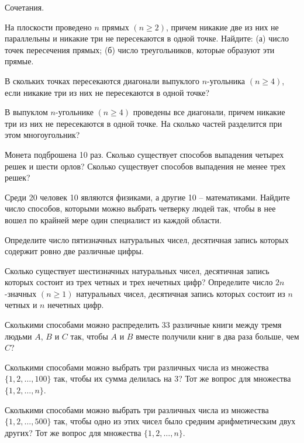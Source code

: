 \biLangHeader
{}
{Сочетания.}

\begin{problemList}

\problemItemSimple
{}
{На плоскости проведено $n$ прямых $(n \ge 2)$, причем никакие две из
них не параллельны и никакие три не пересекаются в одной точке.
Найдите: (а) число точек пересечения прямых; (б) число треугольников,
которые образуют эти прямые.}

\problemItemSimple
{}
{В скольких точках пересекаются диагонали выпуклого $n$-угольника
$(n \ge 4)$, если никакие три из них не пересекаются в одной точке?}

\problemItemSimple
{}
{В выпуклом $n$-угольнике $(n \ge 4)$ проведены все диагонали, причем
никакие три из них не пересекаются в одной точке. На сколько частей
разделится при этом многоугольник?}

\problemItemSimple
{}
{Монета подброшена 10 раз. Сколько существует способов выпадения
четырех \guillemotleft решек\guillemotright{} и шести \guillemotleft
орлов\guillemotright? Сколько существует способов выпадения не менее
трех \guillemotleft решек\guillemotright?}

\problemItemSimple
{}
{Среди 20 человек 10 являются физиками, а другие 10 -- математиками.
Найдите число способов, которыми можно выбрать четверку людей так,
чтобы в нее вошел по крайней мере один специалист из каждой области.}

\problemItemSimple
{}
{Определите число пятизначных натуральных чисел, десятичная запись
которых содержит ровно две различные цифры.}

\problemItemSimple
{}
{Сколько существует шестизначных натуральных чисел, десятичная запись
которых состоит из трех четных и трех нечетных цифр? Определите число
$2n$-значных $(n \ge 1)$ натуральных чисел, десятичная запись которых
состоит из $n$ четных и $n$ нечетных цифр.}

\problemItemSimple
{}
{Сколькими способами можно распределить 33 различные книги между тремя
людьми $A$, $B$ и $C$ так, чтобы $A$ и $B$ вместе получили книг в два
раза больше, чем $C$?}

\problemItemSimple
{}
{Сколькими способами можно выбрать три различных числа из множества
$\{1, 2, \ldots, 100\}$ так, чтобы их сумма делилась на 3? Тот же
вопрос для множества $\{1, 2, \ldots, n\}$.}

\problemItemSimple
{}
{Сколькими способами можно выбрать три различных числа из множества
$\{1, 2, \ldots, 500\}$ так, чтобы одно из этих чисел было средним
арифметическим двух других? Тот же вопрос для множества
$\{1, 2, \ldots, n\}$.}


\end{problemList}
